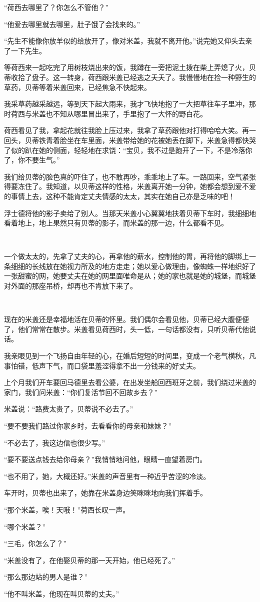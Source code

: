 \par “荷西去哪里了？你怎么不管他？”
\par “他爱去哪里就去哪里，肚子饿了会找来的。”
\par “先生不能像你放羊似的给放开了，像对米盖，我就不离开他。”说完她又仰头去亲了一下先生。
\par 等荷西来一起吃完了用树枝烧出来的饭，我蹲在一旁把泥土拨在柴上弄熄了火，贝蒂收拾了盘子。这一转身，荷西跟米盖已经逃之夭夭了。我慢慢地在捡一种野生的草药，贝蒂等着米盖回来，已经焦急不快起来。
\par 我采草药越采越远，等到天下起大雨来，我才飞快地抱了一大把草往车子里冲，那时荷西与米盖也不知从哪里冒出来了，手里抱了一大怀的野白花。
\par 荷西看见了我，拿起花就往我脸上压过来，我拿了草药跟他对打得哈哈大笑。再一回头，贝蒂铁青着脸坐在车里面，米盖带给她的花被她丢在脚下，米盖急得都快哭了似的趴在她的侧面，轻轻地在求饶：“宝贝，我不过是跑开了一下，不是冷落你了，你不要生气。”
\par 我们给贝蒂的脸色真的吓住了，也不敢再吵，乖乖地上了车。一路回来，空气紧张得要冻住了。我知道，以贝蒂这样的性格，米盖离开她一分钟，她都会想到爱不爱的事情上去，这种不能肯定丈夫情感的太太，其实在她自己亦是乏味的吧！
\par 浮士德将他的影子卖给了别人。当那天米盖小心翼翼地扶着贝蒂下车时，我细细地看着地上，地上果然只有贝蒂的影子，而米盖的那一边，什么都看不见。
\par  
\par 一个做太太的，先拿了丈夫的心，再拿他的薪水，控制他的胃，再将他的脚绑上一条细细的长线放在她视力所及的地方走走；她以爱心做理由，像蜘蛛一样地织好了一张甜蜜的网，她要丈夫在她的网里面唯命是从；她的家也就是她的城堡，而城堡对外面的那座吊桥，却再也不肯放下来了。
\par  
\par 现在的米盖还是幸福地活在贝蒂的怀里。我们偶尔会看见他，贝蒂已经大腹便便了，他们常常在散步。米盖看见荷西时，头一低，一句话都没有，只听贝蒂代他说话。
\par 我亲眼见到一个飞扬自由年轻的心，在婚后短短的时间里，变成一个老气横秋，凡事怕错，低声下气，而口袋里羞涩得拿不出一分钱来的好丈夫。
\par 上个月我们开车要回马德里去看公婆，在出发坐船回西班牙之前，我们绕过米盖的家门，我们问米盖：“你们复活节回不回故乡去？”
\par 米盖说：“路费太贵了，贝蒂说不必去了。”
\par “要不要我们路过你家乡时，去看看你的母亲和妹妹？”
\par “不必去了，我这边信也很少写。”
\par “要不要送点钱去给你母亲？”我悄悄地问他，眼睛一直望着房门。
\par “也不用了，她，大概还好。”米盖的声音里有一种近乎苦涩的冷淡。
\par 车开时，贝蒂也出来了，她靠在米盖身边笑眯眯地向我们挥着手。
\par “那个米盖，唉！天哦！”荷西长叹一声。
\par “哪个米盖？”
\par “三毛，你怎么了？”
\par “米盖没有了，在他娶贝蒂的那一天开始，他已经死了。”
\par “那么那边站的男人是谁？”
\par “他不叫米盖，他现在叫贝蒂的丈夫。”


